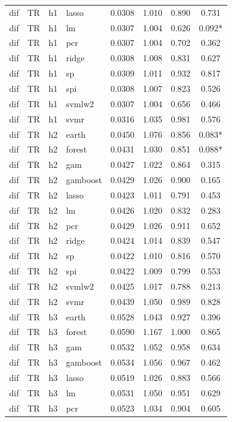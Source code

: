 \begin{ThreePartTable}
\begin{longtable}[t]{llclcccc}
dif & TR & h1 & lasso & 0.0308 & 1.010 & 0.890 & 0.731\\
dif & TR & h1 & lm & 0.0307 & 1.004 & 0.626 & 0.092*\\
dif & TR & h1 & pcr & 0.0307 & 1.004 & 0.702 & 0.362\\
dif & TR & h1 & ridge & 0.0308 & 1.008 & 0.831 & 0.627\\
dif & TR & h1 & sp & 0.0309 & 1.011 & 0.932 & 0.817\\
dif & TR & h1 & spi & 0.0308 & 1.007 & 0.823 & 0.526\\
dif & TR & h1 & svmlw2 & 0.0307 & 1.004 & 0.656 & 0.466\\
dif & TR & h1 & svmr & 0.0316 & 1.035 & 0.981 & 0.576\\
\addlinespace
dif & TR & h2 & earth & 0.0450 & 1.076 & 0.856 & 0.083*\\
dif & TR & h2 & forest & 0.0431 & 1.030 & 0.851 & 0.088*\\
dif & TR & h2 & gam & 0.0427 & 1.022 & 0.864 & 0.315\\
dif & TR & h2 & gamboost & 0.0429 & 1.026 & 0.900 & 0.165\\
dif & TR & h2 & lasso & 0.0423 & 1.011 & 0.791 & 0.453\\
dif & TR & h2 & lm & 0.0426 & 1.020 & 0.832 & 0.283\\
dif & TR & h2 & pcr & 0.0429 & 1.026 & 0.911 & 0.652\\
dif & TR & h2 & ridge & 0.0424 & 1.014 & 0.839 & 0.547\\
dif & TR & h2 & sp & 0.0422 & 1.010 & 0.816 & 0.570\\
dif & TR & h2 & spi & 0.0422 & 1.009 & 0.799 & 0.553\\
dif & TR & h2 & svmlw2 & 0.0425 & 1.017 & 0.788 & 0.213\\
dif & TR & h2 & svmr & 0.0439 & 1.050 & 0.989 & 0.828\\
\addlinespace
dif & TR & h3 & earth & 0.0528 & 1.043 & 0.927 & 0.396\\
dif & TR & h3 & forest & 0.0590 & 1.167 & 1.000 & 0.865\\
dif & TR & h3 & gam & 0.0532 & 1.052 & 0.958 & 0.634\\
dif & TR & h3 & gamboost & 0.0534 & 1.056 & 0.967 & 0.462\\
dif & TR & h3 & lasso & 0.0519 & 1.026 & 0.883 & 0.566\\
dif & TR & h3 & lm & 0.0531 & 1.050 & 0.951 & 0.629\\
dif & TR & h3 & pcr & 0.0523 & 1.034 & 0.904 & 0.605\\

\end{longtable}
\end{ThreePartTable}
